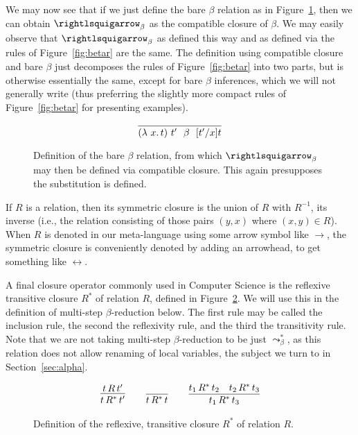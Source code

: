 We may now see that if we just define the bare $\beta$ relation as in
Figure~\ref{fig:barebeta}, then we can obtain $\betar$ as the
compatible closure of $\beta$.  We may easily observe that
$\betar$ as defined this way and as defined via the rules of
Figure~\ref{fig:betar} are the same.  The definition using compatible
closure and bare $\beta$ just decomposes the rules of
Figure~\ref{fig:betar} into two parts, but is otherwise essentially
the same, except for bare $\beta$ inferences, which we will not generally
write (thus preferring the slightly more compact rules of Figure~\ref{fig:betar} for
presenting examples).

\begin{figure}
  \[
    \infer{(\lam{x}{t})\ t' \ \ \beta\ \ [t'/x]t}{\ }
  \]

  \caption{Definition of the bare $\beta$ relation, from which $\betar$ may then be defined
    via compatible closure.  This again presupposes the substitution is defined.}
\label{fig:barebeta}
\end{figure}

\begin{definition}
If $R$ is a relation, then its symmetric closure is the union of $R$ with $R^{-1}$, its inverse (i.e., the relation consisting
of those pairs $(y,x)$ where $(x,y) \in R$).  When $R$ is denoted in our
meta-language using some arrow symbol like $\to$, the symmetric closure is conveniently denoted by adding an arrowhead, to get
something like $\leftrightarrow$.
\end{definition}

A final closure operator commonly used in Computer Science is the reflexive transitive closure $R^*$ of relation $R$, defined in Figure~\ref{fig:rtcl}.
We will use this in the definition of multi-step $\beta$-reduction below.  The first rule may be called the inclusion rule,
the second the reflexivity rule, and the third the transitivity rule.
Note that we are not taking multi-step $\beta$-reduction
to be just $\leadsto_\beta^*$, as this relation does not allow renaming of local variables, the subject we turn to in Section~\ref{sec:alpha}.

\begin{figure}
  \[
  \begin{array}{lllllll}
    \infer{t\,R^*\,t'}{t\,R\,t'}&\,&
    \infer{t\,R^*\,t}{\,}&\,&
    \infer{t_1\,R^*\,t_3}{t_1\,R^*\,t_2 & t_2\,R^*\,t_3}
  \end{array}
  \]
  \caption{Definition of the reflexive, transitive closure $R^*$ of relation $R$.}
  \label{fig:rtcl}
  \end{figure}

